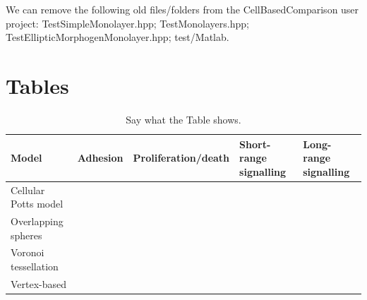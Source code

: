 \documentclass[12pt]{article}
\begin{document}
We can remove the following old files/folders from the CellBasedComparison user project: 
TestSimpleMonolayer.hpp; 
TestMonolayers.hpp; 
TestEllipticMorphogenMonolayer.hpp; 
test/Matlab.


\clearpage
\section{Tables}

\begin{table}
\centering
\begin{tabular}{lllll}
\toprule
Model & Adhesion & Proliferation/death & Short-range signalling & Long-range signalling \\
\midrule
Cellular Potts model &  &  &  &  \\ 
Overlapping spheres &  &  &  &  \\ 
Voronoi tessellation &  &  &  &  \\ 
Vertex-based &  &  &  &  \\ 
\bottomrule
\end{tabular}
\caption{Say what the Table shows.}
\label{tab:properties}
\end{table}

\end{document}
